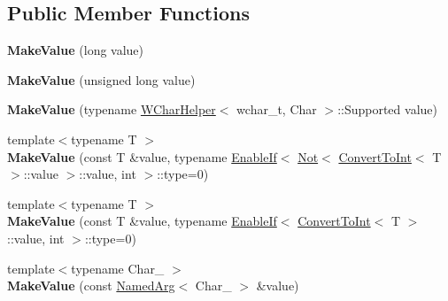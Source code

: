 \subsection*{Public Member Functions}
\begin{DoxyCompactItemize}
\item 
{\bfseries Make\+Value} (long value)\hypertarget{classfmt_1_1internal_1_1MakeValue_ad7e52c1fc3d087a666bdd55bfda0c79c}{}\label{classfmt_1_1internal_1_1MakeValue_ad7e52c1fc3d087a666bdd55bfda0c79c}

\item 
{\bfseries Make\+Value} (unsigned long value)\hypertarget{classfmt_1_1internal_1_1MakeValue_a09061194386798ee1f7652ff0100192e}{}\label{classfmt_1_1internal_1_1MakeValue_a09061194386798ee1f7652ff0100192e}

\item 
{\bfseries Make\+Value} (typename \hyperlink{structfmt_1_1internal_1_1WCharHelper}{W\+Char\+Helper}$<$ wchar\+\_\+t, Char $>$\+::Supported value)\hypertarget{classfmt_1_1internal_1_1MakeValue_acee23248667dcf84353cecf3e8f28d67}{}\label{classfmt_1_1internal_1_1MakeValue_acee23248667dcf84353cecf3e8f28d67}

\item 
{\footnotesize template$<$typename T $>$ }\\{\bfseries Make\+Value} (const T \&value, typename \hyperlink{structfmt_1_1internal_1_1EnableIf}{Enable\+If}$<$ \hyperlink{structfmt_1_1internal_1_1Not}{Not}$<$ \hyperlink{structfmt_1_1internal_1_1ConvertToInt}{Convert\+To\+Int}$<$ T $>$\+::value $>$\+::value, int $>$\+::type=0)\hypertarget{classfmt_1_1internal_1_1MakeValue_a84e3301c4bda7c59a0d065462b4c7de5}{}\label{classfmt_1_1internal_1_1MakeValue_a84e3301c4bda7c59a0d065462b4c7de5}

\item 
{\footnotesize template$<$typename T $>$ }\\{\bfseries Make\+Value} (const T \&value, typename \hyperlink{structfmt_1_1internal_1_1EnableIf}{Enable\+If}$<$ \hyperlink{structfmt_1_1internal_1_1ConvertToInt}{Convert\+To\+Int}$<$ T $>$\+::value, int $>$\+::type=0)\hypertarget{classfmt_1_1internal_1_1MakeValue_a7635061558249117606a4facce211b03}{}\label{classfmt_1_1internal_1_1MakeValue_a7635061558249117606a4facce211b03}

\item 
{\footnotesize template$<$typename Char\+\_\+ $>$ }\\{\bfseries Make\+Value} (const \hyperlink{structfmt_1_1internal_1_1NamedArg}{Named\+Arg}$<$ Char\+\_\+ $>$ \&value)\hypertarget{classfmt_1_1internal_1_1MakeValue_a282289e2dd46a048c06d4994423e1fa4}{}\label{classfmt_1_1internal_1_1MakeValue_a282289e2dd46a048c06d4994423e1fa4}

\end{DoxyCompactItemize}
